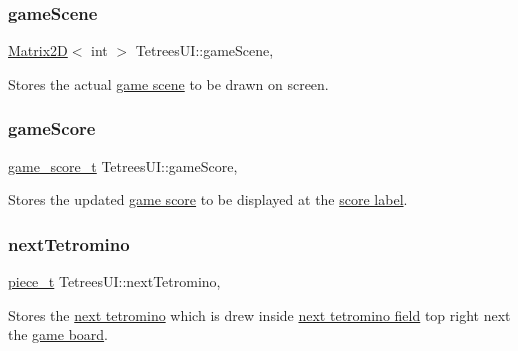 \subsubsection{\texorpdfstring{game\+Scene}{gameScene}}
{\footnotesize\ttfamily \hyperlink{classMatrix2D}{Matrix2D}$<$ int $>$ Tetrees\+U\+I\+::game\+Scene\hspace{0.3cm}{\ttfamily [static]}, {\ttfamily [private]}}

Stores the actual \hyperlink{classTetreesEngine_aeade477c0bc2eaaa894ebbdaca93584e}{game scene} to be drawn on screen. \mbox{\label{classTetreesUI_a128491041c6b77acec829fb5b1f4dafb}} 
\subsubsection{\texorpdfstring{game\+Score}{gameScore}}
{\footnotesize\ttfamily \hyperlink{structgame__score__t}{game\+\_\+score\+\_\+t} Tetrees\+U\+I\+::game\+Score\hspace{0.3cm}{\ttfamily [static]}, {\ttfamily [private]}}

Stores the updated \hyperlink{structgame__data__t_a70e04b66160685cc84bcdd30edb97e46}{game score} to be displayed at the \hyperlink{TetreesUI_8cpp_ae067b2d6b08b38aa73b035c82d9e14b0}{score label}. \mbox{\label{classTetreesUI_a6296ce8f3cde853cec110718c4b88540}} 
\subsubsection{\texorpdfstring{next\+Tetromino}{nextTetromino}}
{\footnotesize\ttfamily \hyperlink{structpiece__t}{piece\+\_\+t} Tetrees\+U\+I\+::next\+Tetromino\hspace{0.3cm}{\ttfamily [static]}, {\ttfamily [private]}}

Stores the \hyperlink{classTetreesEngine_a44c902481f5d8a72ca8a78d24f5c3a33}{next tetromino} which is drew inside \hyperlink{TetreesUI_8cpp_aac997784ac88b494498d6e08d6fe62d5}{next tetromino field} top right next the \hyperlink{classTetreesEngine_a37d082a7816d6731b2703dd6d1a1cb97}{game board}. \mbox{\label{classTetreesUI_a80545840b2848938d01d7f85786ee141}} 
